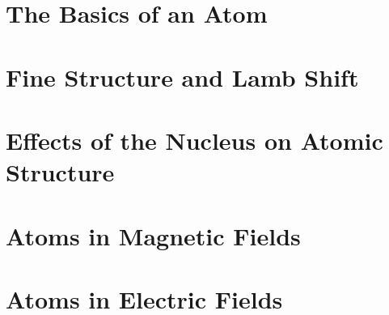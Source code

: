 \documentclass{book}
\theoremstyle{definition}
\begin{document}
\chapter{The Basics of an Atom}








\chapter{Fine Structure and Lamb Shift}
















\chapter{Effects of the Nucleus on Atomic Structure}














\chapter{Atoms in Magnetic Fields}












\chapter{Atoms in Electric Fields}





\end{document}
